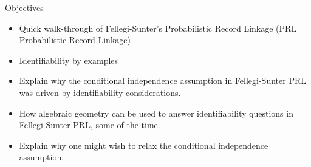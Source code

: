 
\begin{frame}{\vskip 0.1cm \huge Objectives}

\vskip -0.10cm

\small

\begin{itemize}
\pause\item
	Quick walk-through of Fellegi-Sunter's Probabilistic Record Linkage
	\vskip -0.1cm
	{\scriptsize(PRL = Probabilistic Record Linkage)}
	\vskip 0.35cm
\pause\item
	{\color{customRed}Identifiability} by examples
	\vskip 0.35cm
\pause\item
	Explain why the {\color{customRed}conditional independence} assumption
	in Fellegi-Sunter PRL was driven by identifiability considerations.
	\vskip 0.35cm
\pause\item
	How {\color{customRed}algebraic geometry} can be used to answer
	identifiability questions in Fellegi-Sunter PRL, some of the time.
	\vskip 0.35cm
\pause\item
	Explain why one might wish to {\color{customRed}relax}
	the conditional independence assumption.%
\end{itemize}

\end{frame}
\normalsize

